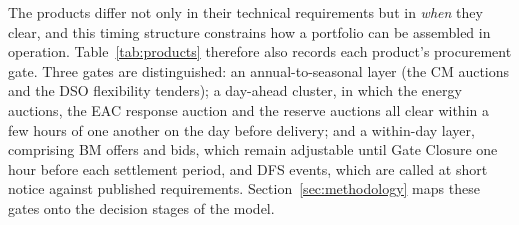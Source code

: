 \documentclass[lettersize,journal]{IEEEtran}
\begin{document}
The products differ not only in their technical requirements but in \emph{when} they clear, and this timing structure constrains how a portfolio can be assembled in operation. Table~\ref{tab:products} therefore also records each product's procurement gate. Three gates are distinguished: an annual-to-seasonal layer (the CM auctions and the DSO flexibility tenders); a day-ahead cluster, in which the energy auctions, the EAC response auction and the reserve auctions all clear within a few hours of one another on the day before delivery; and a within-day layer, comprising BM offers and bids, which remain adjustable until Gate Closure one hour before each settlement period, and DFS events, which are called at short notice against published requirements. Section~\ref{sec:methodology} maps these gates onto the decision stages of the model.
\end{document}
